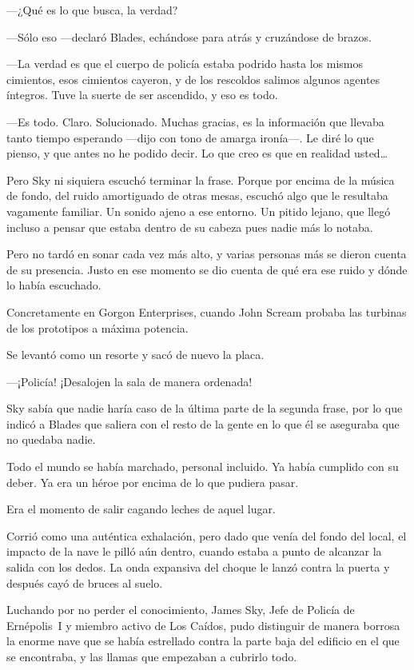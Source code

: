 ---¿Qué es lo que busca, la verdad?

---Sólo eso ---declaró Blades, echándose para atrás y cruzándose de brazos.

---La verdad es que el cuerpo de policía estaba podrido hasta los mismos cimientos, esos cimientos cayeron, y de los rescoldos salimos algunos agentes íntegros. Tuve la suerte de ser ascendido, y eso es todo.

---Es todo. Claro. Solucionado. Muchas gracias, es la información que llevaba tanto tiempo esperando ---dijo con tono de amarga ironía---. Le diré lo que pienso, y que antes no he podido decir. Lo que creo es que en realidad usted\dots

Pero Sky ni siquiera escuchó terminar la frase. Porque por encima de la música de fondo, del ruido amortiguado de otras mesas, escuchó algo que le resultaba vagamente familiar. Un sonido ajeno a ese entorno. Un pitido lejano, que llegó incluso a pensar que estaba dentro de su cabeza pues nadie más lo notaba.

Pero no tardó en sonar cada vez más alto, y varias personas más se dieron cuenta de su presencia. Justo en ese momento se dio cuenta de qué era ese ruido y dónde lo había escuchado.

Concretamente en Gorgon Enterprises, cuando John Scream probaba las turbinas de los prototipos a máxima potencia.

Se levantó como un resorte y sacó de nuevo la placa.

---¡Policía! ¡Desalojen la sala de manera ordenada!

Sky sabía que nadie haría caso de la última parte de la segunda frase, por lo que indicó a Blades que saliera con el resto de la gente en lo que él se aseguraba que no quedaba nadie.

Todo el mundo se había marchado, personal incluido. Ya había cumplido con su deber. Ya era un héroe por encima de lo que pudiera pasar.

Era el momento de salir cagando leches de aquel lugar.

Corrió como una auténtica exhalación, pero dado que venía del fondo del local, el impacto de la nave le pilló aún dentro, cuando estaba a punto de alcanzar la salida con los dedos. La onda expansiva del choque le lanzó contra la puerta y después cayó de bruces al suelo.

Luchando por no perder el conocimiento, James Sky, Jefe de Policía de Ernépolis~I y miembro activo de Los Caídos, pudo distinguir de manera borrosa la enorme nave que se había estrellado contra la parte baja del edificio en el que se encontraba, y las llamas que empezaban a cubrirlo todo.

